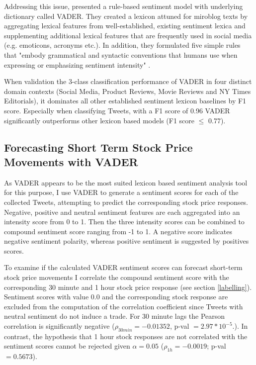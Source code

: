 \documentclass[a4paper,12pt]{article}%
\begin{document}
Addressing this issue, \citet{Hutto2014} presented a rule-based sentiment model with underlying dictionary called VADER. They created a lexicon attuned for miroblog texts by aggregating lexical features from well-established, existing sentiment lexica and supplementing additional lexical features that are frequently used in social media (e.g. emoticons, acronyms etc.). In addition, they formulated five simple rules that "embody grammatical and syntactic conventions that humans use when expressing or emphasizing sentiment intensity" \citep{Hutto2014}. 

When validation the 3-class classification performance of VADER in four distinct domain contexts (Social Media, Product Reviews, Movie Reviews and NY Times Editorials), it dominates all other established sentiment lexicon baselines by F1 score. Especially when classifying Tweets, with a F1 score of 0.96 VADER significantly outperforms other lexicon based models (F1 score $\leq$ 0.77).

\subsection{Forecasting Short Term Stock Price Movements with VADER \label{vader_short_term}}

As VADER appears to be the most suited lexicon based sentiment analysis tool for this purpose, I use VADER to generate a sentiment scores for each of the collected Tweets, attempting to predict the corresponding stock price responses. Negative, positive and neutral sentiment features are each aggregated into an intensity score from 0 to 1. Then the three intensity scores can be combined to compound sentiment score ranging from -1 to 1. A negative score indicates negative sentiment polarity, whereas positive sentiment is suggested by positives scores.

To examine if the calculated VADER sentiment scores can forecast short-term stock price movements I correlate the compound sentiment score with the corresponding 30 minute and 1 hour stock price response (see section \ref{labelling}). Sentiment scores with value 0.0 and the corresponding stock response are excluded from the computation of the correlation coefficient since Tweets with neutral sentiment do not induce a trade. For 30 minute lags the Pearson correlation is significantly negative ($\rho_{30min}=-0.01352$, p-val $= 2.97 * 10^{-5}$.). In contrast, the hypothesis that 1 hour stock responses are not correlated with the sentiment scores cannot be rejected given $\alpha = 0.05$ ($\rho_{1h}=-0.0019$; p-val $=0.5673$).
\end{document}
